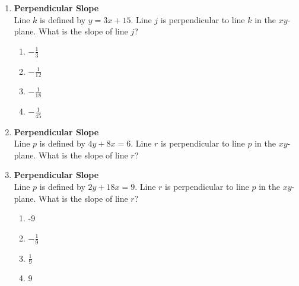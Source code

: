 \begin{enumerate}
\item \textbf{Perpendicular Slope}\\
Line $k$ is defined by $y = 3x + 15$. Line $j$ is perpendicular to line $k$ in the $xy$-plane. What is the slope of line $j$?
\begin{enumerate}[label=(\Alph*)]
  \item $-\frac{1}{3}$
  \item $-\frac{1}{12}$
  \item $-\frac{1}{18}$
  \item $-\frac{1}{45}$
\end{enumerate}
\begin{subanswer}
\end{subanswer}

\item \textbf{Perpendicular Slope}\\
Line $p$ is defined by $4y + 8x = 6$. Line $r$ is perpendicular to line $p$ in the $xy$-plane. What is the slope of line $r$?
\begin{subanswer}
\end{subanswer}

\item \textbf{Perpendicular Slope}\\
Line $p$ is defined by $2y + 18x = 9$. Line $r$ is perpendicular to line $p$ in the $xy$-plane. What is the slope of line $r$?
\begin{enumerate}[label=(\Alph*)]
  \item -9
  \item $-\frac{1}{9}$
  \item $\frac{1}{9}$
  \item 9
\end{enumerate}
\begin{subanswer}
\end{subanswer}


\end{enumerate}

